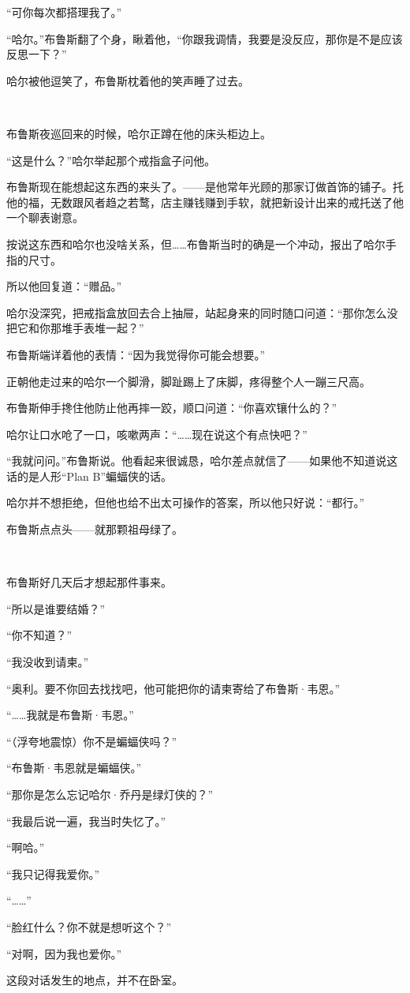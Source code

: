 \documentclass[../main.tex]{subfiles}
\begin{document}
“可你每次都搭理我了。”

“哈尔。”布鲁斯翻了个身，瞅着他，“你跟我调情，我要是没反应，那你是不是应该反思一下？”

哈尔被他逗笑了，布鲁斯枕着他的笑声睡了过去。

~\

布鲁斯夜巡回来的时候，哈尔正蹲在他的床头柜边上。

“这是什么？”哈尔举起那个戒指盒子问他。

布鲁斯现在能想起这东西的来头了。——是他常年光顾的那家订做首饰的铺子。托他的福，无数跟风者趋之若鹜，店主赚钱赚到手软，就把新设计出来的戒托送了他一个聊表谢意。

按说这东西和哈尔也没啥关系，但……布鲁斯当时的确是一个冲动，报出了哈尔手指的尺寸。

所以他回复道：“赠品。”

哈尔没深究，把戒指盒放回去合上抽屉，站起身来的同时随口问道：“那你怎么没把它和你那堆手表堆一起？”

布鲁斯端详着他的表情：“因为我觉得你可能会想要。”

正朝他走过来的哈尔一个脚滑，脚趾踢上了床脚，疼得整个人一蹦三尺高。

布鲁斯伸手搀住他防止他再摔一跤，顺口问道：“你喜欢镶什么的？”

哈尔让口水呛了一口，咳嗽两声：“……现在说这个有点快吧？”

“我就问问。”布鲁斯说。他看起来很诚恳，哈尔差点就信了——如果他不知道说这话的是人形“Plan
B”蝙蝠侠的话。

哈尔并不想拒绝，但他也给不出太可操作的答案，所以他只好说：“都行。”

布鲁斯点点头——就那颗祖母绿了。

~\

布鲁斯好几天后才想起那件事来。

“所以是谁要结婚？”

“你不知道？”

“我没收到请柬。”

“奥利。要不你回去找找吧，他可能把你的请柬寄给了布鲁斯·韦恩。”

“……我就是布鲁斯·韦恩。”

“（浮夸地震惊）你不是蝙蝠侠吗？”

“布鲁斯·韦恩就是蝙蝠侠。”

“那你是怎么忘记哈尔·乔丹是绿灯侠的？”

“我最后说一遍，我当时失忆了。”

“啊哈。”

“我只记得我爱你。”

“……”

“脸红什么？你不就是想听这个？”

“对啊，因为我也爱你。”

这段对话发生的地点，并不在卧室。

\storyend

\end{document}
